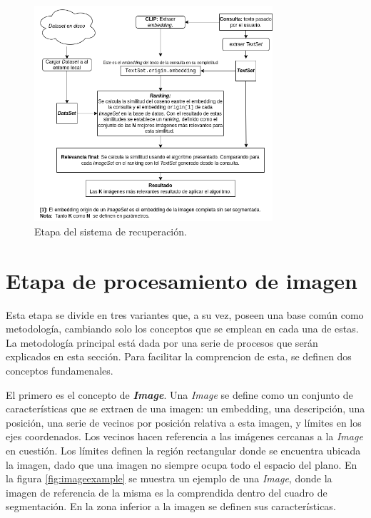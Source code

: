 \begin{figure}[H]
\centering
\includegraphics[height=80mm]{Graphics/SystemRetrieval.drawio.png}
\caption{Etapa del sistema de recuperaci\'on.}
\label{fig:etapa3}
\end{figure}


\section{Etapa de procesamiento de imagen}
Esta etapa se divide en tres variantes que, a su vez, poseen una base común como metodología, cambiando solo los conceptos que se emplean en cada una de estas. La metodología principal está dada por una serie de procesos que serán explicados en esta sección. Para facilitar la comprencion de esta, se definen dos conceptos fundamenales.

El primero es el concepto de \textbf{\textit{Image}}. Una \textit{Image} se define como un conjunto de características que se extraen de una imagen: un embedding, una descripción, una posición, una serie de vecinos por posición relativa a esta imagen, y límites en los ejes coordenados. Los vecinos hacen referencia a las imágenes cercanas a la \textit{Image} en cuestión. Los límites definen la región rectangular donde se encuentra ubicada la imagen, dado que una imagen no siempre ocupa todo el espacio del plano. En la figura \ref{fig:imageexample} se muestra un ejemplo de una \textit{Image}, donde la imagen de referencia de la misma es la comprendida dentro del cuadro de segmentaci\'on. En la zona inferior a la imagen se definen sus caracter\'isticas.

